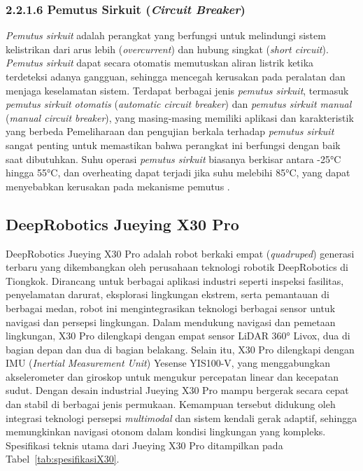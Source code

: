 \subsubsection{2.2.1.6 Pemutus Sirkuit (\emph{Circuit Breaker})}
\emph{Pemutus sirkuit} adalah perangkat yang berfungsi untuk melindungi sistem kelistrikan dari arus lebih (\emph{overcurrent}) dan hubung singkat (\emph{short circuit}). \emph{Pemutus sirkuit} dapat secara otomatis memutuskan aliran listrik ketika terdeteksi adanya gangguan, sehingga mencegah kerusakan pada peralatan dan menjaga keselamatan sistem. Terdapat berbagai jenis \emph{pemutus sirkuit}, termasuk \emph{pemutus sirkuit otomatis} (\emph{automatic circuit breaker}) dan \emph{pemutus sirkuit manual} (\emph{manual circuit breaker}), yang masing-masing memiliki aplikasi dan karakteristik yang berbeda Pemeliharaan dan pengujian berkala terhadap \emph{pemutus sirkuit} sangat penting untuk memastikan bahwa perangkat ini berfungsi dengan baik saat dibutuhkan. Suhu operasi \emph{pemutus sirkuit} biasanya berkisar antara -25°C hingga 55°C, dan overheating dapat terjadi jika suhu melebihi 85°C, yang dapat menyebabkan kerusakan pada mekanisme pemutus \cite{Ilomets2020}.

\subsection{DeepRobotics Jueying X30 Pro}
DeepRobotics Jueying X30 Pro adalah robot berkaki empat (\textit{quadruped}) generasi terbaru yang dikembangkan oleh perusahaan teknologi robotik DeepRobotics di Tiongkok. Dirancang untuk berbagai aplikasi industri seperti inspeksi fasilitas, penyelamatan darurat, eksplorasi lingkungan ekstrem, serta pemantauan di berbagai medan, robot ini mengintegrasikan teknologi berbagai sensor untuk navigasi dan persepsi lingkungan. Dalam mendukung navigasi dan pemetaan lingkungan, X30 Pro dilengkapi dengan empat sensor LiDAR 360° Livox, dua di bagian depan dan dua di bagian belakang. Selain itu, X30 Pro dilengkapi dengan IMU (\textit{Inertial Measurement Unit}) Yesense YIS100-V, yang menggabungkan akselerometer dan giroskop untuk mengukur percepatan linear dan kecepatan sudut. Dengan desain industrial Jueying X30 Pro mampu bergerak secara cepat dan stabil di berbagai jenis permukaan. Kemampuan tersebut didukung oleh integrasi teknologi persepsi \emph{multimodal} dan sistem kendali gerak adaptif, sehingga memungkinkan navigasi otonom dalam kondisi lingkungan yang kompleks. Spesifikasi teknis utama dari Jueying X30 Pro ditampilkan pada Tabel~\ref{tab:spesifikasiX30}.


